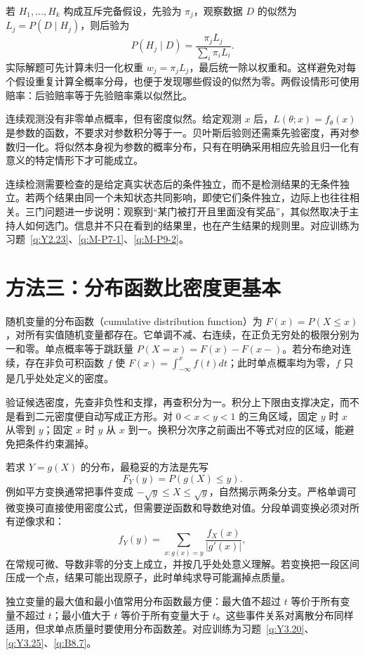 \documentclass[UTF8,12pt,a4paper,fontset=fandol]{ctexbook}
\begin{document}
若 $H_1,\ldots,H_k$ 构成互斥完备假设，先验为 $\pi_j$，观察数据 $D$ 的似然为 $L_j=P(D\mid H_j)$，则后验为
\[
P(H_j\mid D)=\frac{\pi_jL_j}{\sum_i\pi_iL_i}.
\]
实际解题可先计算未归一化权重 $w_j=\pi_jL_j$，最后统一除以权重和。这样避免对每个假设重复计算全概率分母，也便于发现哪些假设的似然为零。两假设情形可使用赔率：后验赔率等于先验赔率乘以似然比。

连续观测没有非零单点概率，但有密度似然。给定观测 $x$ 后，$L(\theta;x)=f_\theta(x)$ 是参数的函数，不要求对参数积分等于一。贝叶斯后验则还需乘先验密度，再对参数归一化。将似然本身视为参数的概率分布，只有在明确采用相应先验且归一化有意义的特定情形下才可能成立。

连续检测需要检查的是给定真实状态后的条件独立，而不是检测结果的无条件独立。若两个结果由同一个未知状态共同影响，即使它们条件独立，边际上也往往相关。三门问题进一步说明：观察到“某门被打开且里面没有奖品”，其似然取决于主持人如何选门。信息并不只在看到的结果里，也在产生结果的规则里。对应训练为习题~\ref{q:Y2.23}、\ref{q:M-P7-1}、\ref{q:M-P9-2}。

\section*{方法三：分布函数比密度更基本}
随机变量的分布函数（cumulative distribution function）为 $F(x)=P(X\le x)$，对所有实值随机变量都存在。它单调不减、右连续，在正负无穷处的极限分别为一和零。单点概率等于跳跃量 $P(X=x)=F(x)-F(x-)$。若分布绝对连续，存在非负可积函数 $f$ 使 $F(x)=\int_{-\infty}^xf(t)dt$；此时单点概率均为零，$f$ 只是几乎处处定义的密度。

验证候选密度，先查非负性和支撑，再查积分为一。积分上下限由支撑决定，而不是看到二元密度便自动写成正方形。对 $0<x<y<1$ 的三角区域，固定 $y$ 时 $x$ 从零到 $y$；固定 $x$ 时 $y$ 从 $x$ 到一。换积分次序之前画出不等式对应的区域，能避免把条件约束漏掉。

若求 $Y=g(X)$ 的分布，最稳妥的方法是先写
\[
F_Y(y)=P(g(X)\le y).
\]
例如平方变换通常把事件变成 $-\sqrt y\le X\le\sqrt y$，自然揭示两条分支。严格单调可微变换可直接使用密度公式，但需要逆函数和导数绝对值。分段单调变换必须对所有逆像求和：
\[
f_Y(y)=\sum_{x:g(x)=y}\frac{f_X(x)}{|g'(x)|},
\]
在常规可微、导数非零的分支上成立，并按几乎处处意义理解。若变换把一段区间压成一个点，结果可能出现原子，此时单纯求导可能漏掉点质量。

独立变量的最大值和最小值常用分布函数最方便：最大值不超过 $t$ 等价于所有变量不超过 $t$；最小值大于 $t$ 等价于所有变量大于 $t$。这些事件关系对离散分布同样适用，但求单点质量时要使用分布函数差。对应训练为习题~\ref{q:Y3.20}、\ref{q:Y3.25}、\ref{q:B8.7}。
\end{document}

